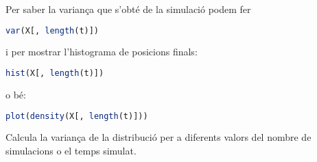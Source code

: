 \begin{exr}{}
Per saber la variança que s'obté de la simulació podem fer
\begin{lstlisting}[language=R]
var(X[, length(t)])
\end{lstlisting}
i per mostrar l'histograma de posicions finals:
\begin{lstlisting}[language=R]
hist(X[, length(t)])
\end{lstlisting}
o bé:
\begin{lstlisting}[language=R]
plot(density(X[, length(t)]))
\end{lstlisting}
Calcula la variança de la distribució per a diferents valors del nombre de simulacions o el temps simulat.
\end{exr}
